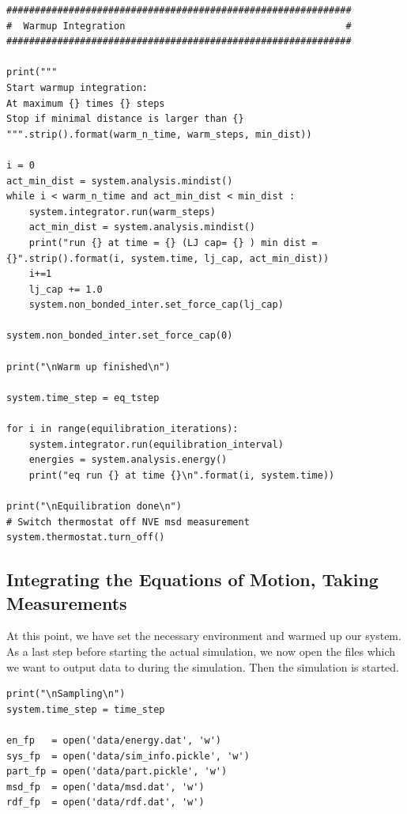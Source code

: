 \documentclass[
paper=a4,                       %
fontsize=11pt,                  %
twoside,                        %
footsepline,                    %
headsepline,                    %
headinclude=false,              %
footinclude=false,              %
pagesize,                       %
]{scrartcl}
\begin{document}
{{\small\vspace{0,2cm}
\begin{lstlisting}
#############################################################
#  Warmup Integration                                       #
#############################################################

print("""
Start warmup integration:
At maximum {} times {} steps
Stop if minimal distance is larger than {}
""".strip().format(warm_n_time, warm_steps, min_dist))

i = 0
act_min_dist = system.analysis.mindist()
while i < warm_n_time and act_min_dist < min_dist :
    system.integrator.run(warm_steps)
    act_min_dist = system.analysis.mindist()
    print("run {} at time = {} (LJ cap= {} ) min dist = {}".strip().format(i, system.time, lj_cap, act_min_dist))
    i+=1
    lj_cap += 1.0
    system.non_bonded_inter.set_force_cap(lj_cap)

system.non_bonded_inter.set_force_cap(0)

print("\nWarm up finished\n")

system.time_step = eq_tstep 

for i in range(equilibration_iterations):
    system.integrator.run(equilibration_interval)
    energies = system.analysis.energy()
    print("eq run {} at time {}\n".format(i, system.time))

print("\nEquilibration done\n")
# Switch thermostat off NVE msd measurement
system.thermostat.turn_off()

\end{lstlisting}}\vspace{0,2cm}

\subsection{Integrating the Equations of Motion, Taking Measurements}
\noindent At this point, we have set the necessary environment and warmed up our system. As a last
step before starting the actual simulation, we now open the files which we want to output data to
during the simulation. Then the simulation is started.

\begin{lstlisting}
print("\nSampling\n")
system.time_step = time_step

en_fp   = open('data/energy.dat', 'w')
sys_fp  = open('data/sim_info.pickle', 'w')
part_fp = open('data/part.pickle', 'w')
msd_fp  = open('data/msd.dat', 'w')
rdf_fp  = open('data/rdf.dat', 'w')


\end{lstlisting}}
\end{document}
